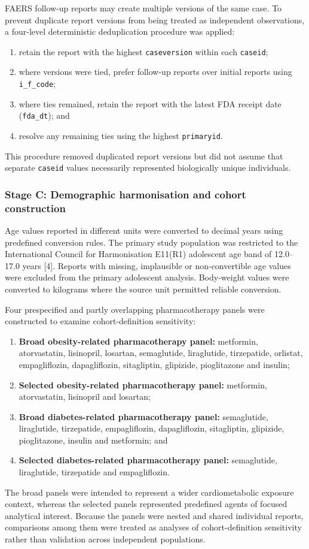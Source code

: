 \documentclass[10pt]{article}
\begin{document}
FAERS follow-up reports may create multiple versions of the same case. To prevent duplicate report versions from being treated as independent observations, a four-level deterministic deduplication procedure was applied:
\begin{enumerate}
\item retain the report with the highest \texttt{caseversion} within each \texttt{caseid};
\item where versions were tied, prefer follow-up reports over initial reports using \texttt{i\_f\_code};
\item where ties remained, retain the report with the latest FDA receipt date (\texttt{fda\_dt}); and
\item resolve any remaining ties using the highest \texttt{primaryid}.
\end{enumerate}
This procedure removed duplicated report versions but did not assume that separate \texttt{caseid} values necessarily represented biologically unique individuals.

\subsubsection{Stage C: Demographic harmonisation and cohort construction}
Age values reported in different units were converted to decimal years using predefined conversion rules. The primary study population was restricted to the International Council for Harmonisation E11(R1) adolescent age band of 12.0--17.0 years [4]. Reports with missing, implausible or non-convertible age values were excluded from the primary adolescent analysis. Body-weight values were converted to kilograms where the source unit permitted reliable conversion.

Four prespecified and partly overlapping pharmacotherapy panels were constructed to examine cohort-definition sensitivity:
\begin{enumerate}
\item \textbf{Broad obesity-related pharmacotherapy panel:} metformin, atorvastatin, lisinopril, losartan, semaglutide, liraglutide, tirzepatide, orlistat, empagliflozin, dapagliflozin, sitagliptin, glipizide, pioglitazone and insulin;
\item \textbf{Selected obesity-related pharmacotherapy panel:} metformin, atorvastatin, lisinopril and losartan;
\item \textbf{Broad diabetes-related pharmacotherapy panel:} semaglutide, liraglutide, tirzepatide, empagliflozin, dapagliflozin, sitagliptin, glipizide, pioglitazone, insulin and metformin; and
\item \textbf{Selected diabetes-related pharmacotherapy panel:} semaglutide, liraglutide, tirzepatide and empagliflozin.
\end{enumerate}
The broad panels were intended to represent a wider cardiometabolic exposure context, whereas the selected panels represented predefined agents of focused analytical interest. Because the panels were nested and shared individual reports, comparisons among them were treated as analyses of cohort-definition sensitivity rather than validation across independent populations.
\end{document}
